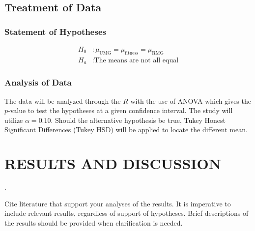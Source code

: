 \documentclass{strrespaper-trad}
\begin{document}
		\section{Treatment of Data}
			\subsection{Statement of Hypotheses} \vspace{-2em}
				\begin{align*}
					H_0 & : \mu_\mathrm{UMG} = \mu_\mathrm{fitness} = \mu_\mathrm{RMG} \\
					H_a & : \text{The means are not all equal}
				\end{align*}
			\subsection{Analysis of Data}
				The data will be analyzed through the $R$ with the use of ANOVA which gives the $p$-value to test the hypotheses at a given confidence interval.
				The study will utilize $\alpha = 0.10$.
				Should the alternative hypothesis be true, Tukey Honest Significant Differences (Tukey HSD) will be applied to locate the different mean.


	\chapter{RESULTS AND DISCUSSION}
		.

		Cite literature that support your analyses of the results.
		It is imperative to include relevant results, regardless of support of hypotheses.
		Brief descriptions of the results should be provided when clarification is needed.
\end{document}
